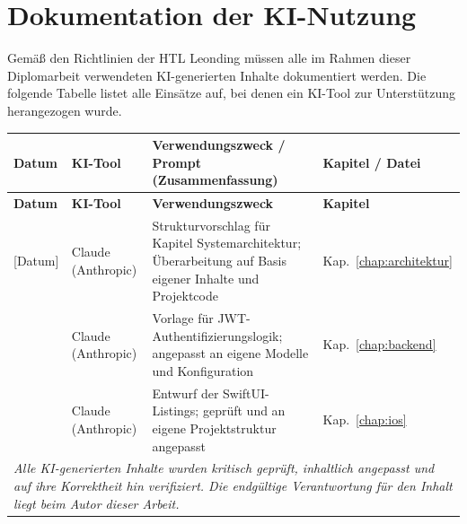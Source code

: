 \chapter{Dokumentation der KI-Nutzung}
\label{app:ki}

Gemäß den Richtlinien der HTL Leonding müssen alle im Rahmen dieser Diplomarbeit
verwendeten KI-generierten Inhalte dokumentiert werden. Die folgende Tabelle listet
alle Einsätze auf, bei denen ein KI-Tool zur Unterstützung herangezogen wurde.

\begin{longtable}{|p{}|p{}|p{}|p{}|}
  \hline
  \textbf{Datum} & \textbf{KI-Tool} & \textbf{Verwendungszweck / Prompt (Zusammenfassung)} &
  \textbf{Kapitel / Datei} \\
  \hline
  \endfirsthead
  \hline
  \textbf{Datum} & \textbf{KI-Tool} & \textbf{Verwendungszweck} & \textbf{Kapitel} \\
  \hline
  \endhead
  [Datum] & Claude (Anthropic) &
  Strukturvorschlag für Kapitel Systemarchitektur; Überarbeitung auf Basis eigener
  Inhalte und Projektcode &
  Kap.~\ref{chap:architektur} \\
  \hline
  [Datum] & Claude (Anthropic) &
  Vorlage für JWT-Authentifizierungslogik; angepasst an eigene Modelle und Konfiguration &
  Kap.~\ref{chap:backend} \\
  \hline
  [Datum] & Claude (Anthropic) &
  Entwurf der SwiftUI-Listings; geprüft und an eigene Projektstruktur angepasst &
  Kap.~\ref{chap:ios} \\
  \hline
  \multicolumn{4}{|p{0.9\textwidth}|}{
    \textit{Alle KI-generierten Inhalte wurden kritisch geprüft, inhaltlich angepasst
    und auf ihre Korrektheit hin verifiziert. Die endgültige Verantwortung für den Inhalt
    liegt beim Autor dieser Arbeit.}
  } \\
  \hline
\end{longtable}
